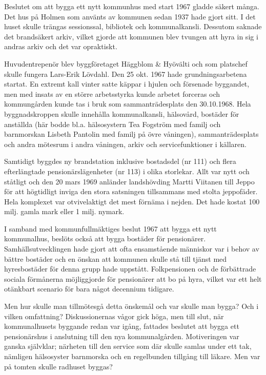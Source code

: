 Beslutet om att bygga ett nytt kommunhus med start 1967 gladde säkert många. Det hus på Holmen som använts av kommunen sedan 1937 hade gjort sitt. I det huset skulle trängas sessionssal, bibliotek och kommunalkansli. Dessutom saknade det brandsäkert arkiv, vilket gjorde att kommunen blev tvungen att hyra in sig i andras arkiv och det var opraktiskt.

Huvudentrepenör blev byggföretaget Häggblom \& Hyövälti och som platschef skulle fungera Lars-Erik Lövdahl. Den 25 okt. 1967 hade grundningsarbetena startat. En extremt kall vinter satte käppar i hjulen och försenade byggandet, men med insats av en större arbetsstyrka kunde arbetet forceras och kommungården kunde tas i bruk som sammanträdesplats den 30.10.1968. Hela byggnadskroppen skulle innehålla kommunalkansli, hälsovård, bostäder för anställda (här bodde bl.a. hälsosystern Tea Fogström med familj och barnmorskan Lisbeth Pantolin med familj på övre våningen), sammanträdesplats och andra mötesrum i andra våningen, arkiv och servicefunktioner i källaren.

Samtidigt byggdes ny brandstation inklusive bostadsdel (nr 111) och flera efterlängtade pensionärslägenheter (nr 113) i olika storlekar. Allt var nytt och ståtligt och den 20 mars 1969 anländer landshövding Martti Viitanen till Jeppo för att högtidligt inviga den stora satsningen tillsammans med stolta jeppofäder. Hela komplexet var otvivelaktigt det mest förnäma i nejden. Det hade kostat 100 milj. gamla mark eller 1 milj. nymark.






I samband med kommunfullmäktiges beslut 1967 att bygga ett nytt kommunalhus, beslöts också att bygga bostäder för pensionärer. Samhällsutvecklingen hade gjort att ofta ensamstående människor var i behov av bättre bostäder och en önskan att kommunen skulle stå till tjänst med hyresbostäder för denna grupp hade uppstått. Folkpensionen och de förbättrade sociala förmånerna möjliggjorde för pensionärer att bo på hyra, vilket var ett helt otänkbart scenario för bara något decennium tidigare.

Men hur skulle man tillmötesgå detta önskemål och var skulle man bygga? Och i vilken omfattning? Diskussionernas vågor gick höga, men till slut, när kommunalhusets byggande redan var igång, fattades beslutet att bygga ett pensionärshus i anslutning till den nya kommunalgården. Motiveringen var ganska självklar; närheten till den service som där skulle samlas under ett tak, nämligen hälsosyster barnmorska och en regelbunden tillgång till läkare. Men var på tomten skulle radhuset byggas?

